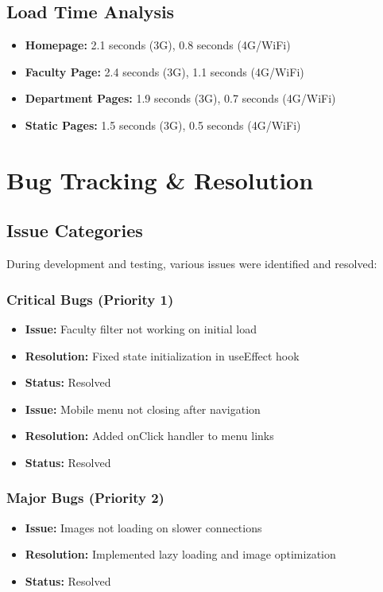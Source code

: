 \documentclass[12pt,a4paper]{report}
\begin{document}
\subsection{Load Time Analysis}

\begin{itemize}
    \item \textbf{Homepage:} 2.1 seconds (3G), 0.8 seconds (4G/WiFi)
    \item \textbf{Faculty Page:} 2.4 seconds (3G), 1.1 seconds (4G/WiFi)
    \item \textbf{Department Pages:} 1.9 seconds (3G), 0.7 seconds (4G/WiFi)
    \item \textbf{Static Pages:} 1.5 seconds (3G), 0.5 seconds (4G/WiFi)
\end{itemize}

\section{Bug Tracking \& Resolution}

\subsection{Issue Categories}

During development and testing, various issues were identified and resolved:

\subsubsection*{Critical Bugs (Priority 1)}
\begin{itemize}
    \item \textbf{Issue:} Faculty filter not working on initial load
    \item \textbf{Resolution:} Fixed state initialization in useEffect hook
    \item \textbf{Status:} Resolved
\end{itemize}

\begin{itemize}
    \item \textbf{Issue:} Mobile menu not closing after navigation
    \item \textbf{Resolution:} Added onClick handler to menu links
    \item \textbf{Status:} Resolved
\end{itemize}

\subsubsection*{Major Bugs (Priority 2)}
\begin{itemize}
    \item \textbf{Issue:} Images not loading on slower connections
    \item \textbf{Resolution:} Implemented lazy loading and image optimization
    \item \textbf{Status:} Resolved
\end{itemize}
\end{document}

